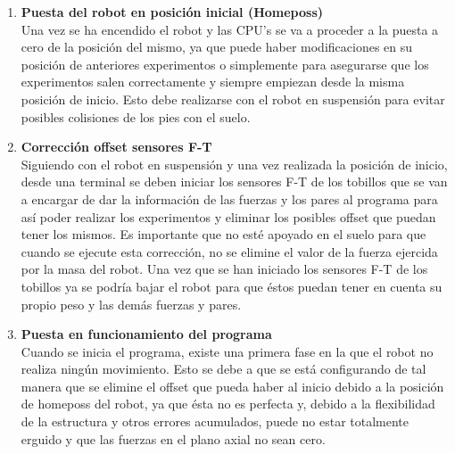 \begin{enumerate}



\item \textbf{Puesta del robot en posición inicial (Homeposs)}\\ Una vez se ha encendido el robot y las CPU's se va a proceder a la puesta a cero de la posición del mismo, ya que puede haber modificaciones en su posición de anteriores experimentos o simplemente para asegurarse que los experimentos salen correctamente y siempre empiezan desde la misma posición de inicio. Esto debe realizarse con el robot en suspensión para evitar posibles colisiones de los pies con el suelo.

\item \textbf{Corrección offset sensores F-T}\\ Siguiendo con el robot en suspensión y una vez realizada la posición de inicio, desde una terminal se deben iniciar los sensores F-T de los tobillos que se van a encargar de dar la información de las fuerzas y los pares al programa para así poder realizar los experimentos y eliminar los posibles offset que puedan tener los mismos. Es importante que no esté apoyado en el suelo para que cuando se ejecute esta corrección, no se elimine el valor de la fuerza ejercida por la masa del robot. Una vez que se han iniciado los sensores F-T de los tobillos ya se podría bajar el robot para que éstos puedan tener en cuenta su propio peso y las demás fuerzas y pares. 

\item \textbf{Puesta en funcionamiento del programa}\\ Cuando se inicia el programa, existe una primera fase en la que el robot no realiza ningún movimiento. Esto se debe a que se está configurando de tal manera que se elimine el offset que pueda haber al inicio debido a la posición de homeposs del robot, ya que ésta no es perfecta y, debido a la flexibilidad de la estructura y otros errores acumulados, puede no estar totalmente erguido y que las fuerzas en el plano axial no sean cero. 


\end{enumerate}
